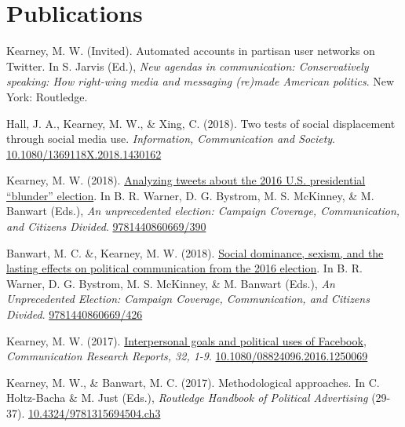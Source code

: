 \section{Publications}
\begin{bibenum}

\item Kearney, M. W. (Invited).
Automated accounts in partisan user networks on Twitter.
In S. Jarvis (Ed.),
\textit{New agendas in communication: Conservatively speaking: How right-wing media and messaging (re)made American politics}. New York: Routledge.

\item Hall, J. A., Kearney, M. W., \& Xing, C. (2018).
	Two tests of social displacement through social media use.
	\textit{Information, Communication and Society}.
	\href{https://doi.org/10.1080/1369118X.2018.1430162}{10.1080/1369118X.2018.1430162}

\item Kearney, M. W. (2018).
	\href{https://books.google.com/books?hl=en&lr=&id=CtVJDwAAQBAJ&oi=fnd&pg=PA383}{Analyzing tweets about the 2016 U.S. presidential ``blunder'' election}.
	In B. R. Warner, D. G. Bystrom, M. S. McKinney, \& M. Banwart (Eds.),
	\textit{An unprecedented election: Campaign Coverage, Communication, and Citizens Divided}.
	\href{http://publisher.abc-clio.com/9781440860669/390}{9781440860669/390}

\item Banwart, M. C. \&, Kearney, M. W. (2018).
	\href{https://books.google.com/books?hl=en&lr=&id=CtVJDwAAQBAJ&oi=fnd&pg=PA419}{Social dominance, sexism, and the lasting effects on political communication from the 2016 election}.
	In B. R. Warner, D. G. Bystrom, M. S. McKinney, \& M. Banwart (Eds.),
	\textit{An Unprecedented Election: Campaign Coverage, Communication, and Citizens Divided}.
	\href{http://publisher.abc-clio.com/9781440860669/426}{9781440860669/426}

\item Kearney, M. W. (2017).
	\href{http://www.tandfonline.com/doi/abs/10.1080/08824096.2016.1250069}{Interpersonal goals and political uses of Facebook},
	\textit{Communication Research Reports, 32, 1-9}.
	\href{https://doi.org/10.1080/08824096.2016.1250069}{10.1080/08824096.2016.1250069}

\item[] Kearney, M. W., \& Banwart, M. C. (2017).
	Methodological approaches.
	In C. Holtz-Bacha \& M. Just (Eds.), \textit{Routledge Handbook of Political Advertising} (29-37).
	\href{https://www.routledgehandbooks.com/doi/10.4324/9781315694504.ch3}{10.4324/9781315694504.ch3}


\end{bibenum}

